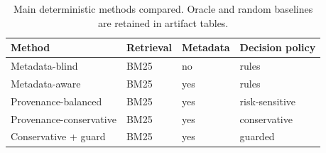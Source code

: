 \begin{table}[t]
\centering
\caption{Main deterministic methods compared. Oracle and random baselines are retained in artifact tables.}
\label{tab:methods-main}
\begin{tabular}{llll}
\toprule
Method & Retrieval & Metadata & Decision policy \\
\midrule
Metadata-blind & BM25 & no & rules \\
Metadata-aware & BM25 & yes & rules \\
Provenance-balanced & BM25 & yes & risk-sensitive \\
Provenance-conservative & BM25 & yes & conservative \\
Conservative + guard & BM25 & yes & guarded \\
\bottomrule
\end{tabular}
\end{table}
